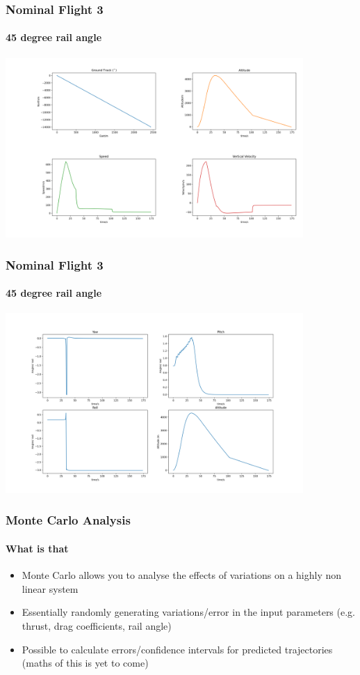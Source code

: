\documentclass{beamer}
\begin{document}
    \begin{frame}
        \frametitle{Nominal Flight 3}
        \framesubtitle{45 degree rail angle}
        \includegraphics[width=0.85\textwidth]{images/example2b.png}
    \end{frame}
    \begin{frame}
        \frametitle{Nominal Flight 3}
        \framesubtitle{45 degree rail angle}
        \includegraphics[width=0.85\textwidth]{images/example3b.png}
    \end{frame}
    \begin{frame}
        \frametitle{Monte Carlo Analysis}
        \framesubtitle{What is that}
        \begin{itemize}
            \item Monte Carlo allows you to analyse the effects of variations on a highly non linear system
            \item Essentially randomly generating variations/error in the input parameters (e.g. thrust, drag coefficients, rail angle)
            \item Possible to calculate errors/confidence intervals for predicted trajectories (maths of this is yet to come)
        \end{itemize} 
    \end{frame}
\end{document}
